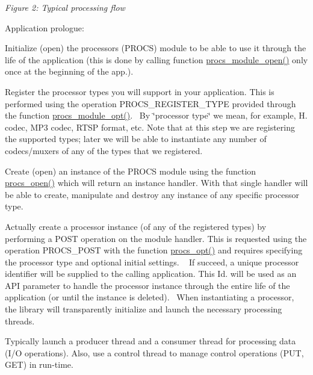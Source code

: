 {\itshape Figure 2\+: Typical processing flow}


\begin{DoxyItemize}
\item Application prologue\+:
\begin{DoxyEnumerate}
\item Initialize (open) the processors (P\+R\+O\+CS) module to be able to use it through the life of the application (this is done by calling function \textquotesingle{}\hyperlink{procs_8c_af5f91a46882b5706b25327384ba347d8}{procs\+\_\+module\+\_\+open()}\textquotesingle{} only once at the beginning of the app.).
\item Register the processor types you will support in your application. This is performed using the operation \textquotesingle{}P\+R\+O\+C\+S\+\_\+\+R\+E\+G\+I\+S\+T\+E\+R\+\_\+\+T\+Y\+PE\textquotesingle{} provided through the function \textquotesingle{}\hyperlink{procs_8c_a226ac6dfd7598a59b9ceab3a92239a80}{procs\+\_\+module\+\_\+opt()}\textquotesingle{}.~\newline
 By \char`\"{}processor type\char`\"{} we mean, for example, H. codec, M\+P3 codec, R\+T\+SP format, etc. Note that at this step we are registering the supported types; later we will be able to instantiate any number of codecs/muxers of any of the types that we registered.
\item Create (open) an instance of the P\+R\+O\+CS module using the function \textquotesingle{}\hyperlink{procs_8c_a6fae33560b633113d848f6ec5e8461e5}{procs\+\_\+open()}\textquotesingle{} which will return an instance handler. With that single handler will be able to create, manipulate and destroy any instance of any specific processor type.
\item Actually create a processor instance (of any of the registered types) by performing a P\+O\+ST operation on the module handler. This is requested using the operation \textquotesingle{}P\+R\+O\+C\+S\+\_\+\+P\+O\+ST\textquotesingle{} with the function \textquotesingle{}\hyperlink{procs_8c_a7af2e6f2788006cfc96ca8d811922ffa}{procs\+\_\+opt()}\textquotesingle{} and requires specifying the processor type and optional initial settings. ~\newline
 If succeed, a unique processor identifier will be supplied to the calling application. This Id. will be used as an A\+PI parameter to handle the processor instance through the entire life of the application (or until the instance is deleted).~\newline
 When instantiating a processor, the library will transparently initialize and launch the necessary processing threads.
\item Typically launch a producer thread and a consumer thread for processing data (I/O operations). Also, use a control thread to manage control operations (P\+UT, G\+ET) in run-\/time. ~\newline


\end{DoxyEnumerate}
\end{DoxyItemize}
